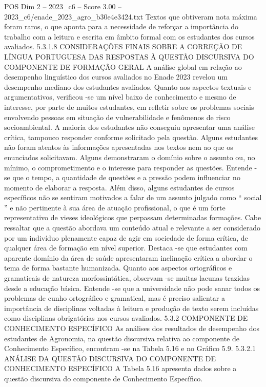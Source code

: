 \begin{textsample}{POS Dim 2 – 2023\_c6 – Score 3.00 – 2023\_c6/enade\_2023\_agro\_b30e4e3424.txt}
Textos que obtiveram nota máxima foram raros, o que aponta para a necessidade de reforçar a importância do trabalho com a leitura e escrita em âmbito formal com os estudantes dos cursos avaliados. 5.3.1.8 CONSIDERAÇÕES FINAIS SOBRE A CORREÇÃO DE LÍNGUA PORTUGUESA DAS RESPOSTAS À QUESTÃO DISCURSIVA DO COMPONENTE DE FORMAÇÃO GERAL A análise global em relação ao desempenho linguístico dos cursos avaliados no Enade 2023 revelou um desempenho mediano dos estudantes avaliados.
Quanto aos aspectos textuais e argumentativos, verificou -se um nível baixo de conhecimento e mesmo de interesse, por parte de muitos estudantes, em refletir sobre os problemas sociais envolvendo pessoas em situação de vulnerabilidade e fenômenos de risco socioambiental.
A maioria dos estudantes não conseguiu apresentar uma análise crítica, tampouco responder conforme solicitado pela questão.
Alguns estudantes não foram atentos às informações apresentadas nos textos nem ao que os enunciados solicitavam.
Alguns demonstraram o domínio sobre o assunto ou, no mínimo, o comprometimento e o interesse para responder as questões.
Entende -se que o tempo, a quantidade de questões e a pressão podem influenciar no momento de elaborar a resposta.
Além disso, alguns estudantes de cursos específicos não se sentiram motivados a falar de um assunto julgado como “ social ” e não pertinente à sua área de atuação profissional, o que é um forte representativo de vieses ideológicos que perpassam determinadas formações.
Cabe ressaltar que a questão abordava um conteúdo atual e relevante a ser considerado por um indivíduo plenamente capaz de agir em sociedade de forma crítica, de qualquer área de formação em nível superior.
Destaca -se que estudantes com aparente domínio da área de saúde apresentaram inclinação crítica a abordar o tema de forma bastante humanizada.
Quanto aos aspectos ortográficos e gramaticais de natureza morfossintática, observam -se muitas lacunas trazidas desde a educação básica.
Entende -se que a universidade não pode sanar todos os problemas de cunho ortográfico e gramatical, mas é preciso salientar a importância de disciplinas voltadas à leitura e produção de texto serem incluídas como disciplinas obrigatórias nos cursos avaliados. 5.3.2 COMPONENTE DE CONHECIMENTO ESPECÍFICO As análises dos resultados de desempenho dos estudantes de Agronomia, na questão discursiva relativa ao componente de Conhecimento Específico, encontram -se na Tabela 5.16 e no Gráfico 5.9. 5.3.2.1 ANÁLISE DA QUESTÃO DISCURSIVA DO COMPONENTE DE CONHECIMENTO ESPECÍFICO A Tabela 5.16 apresenta dados sobre a questão discursiva do componente de Conhecimento Específico.

\end{textsample}
